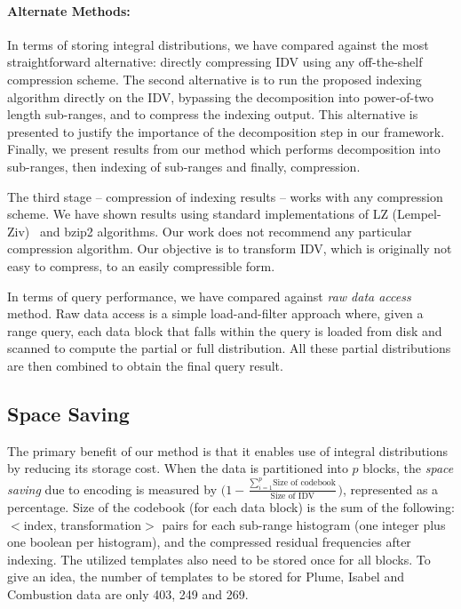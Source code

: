 \paragraph*{Alternate Methods:} In terms of storing integral distributions, we have compared against the most straightforward alternative: directly compressing IDV using any off-the-shelf compression scheme. The second alternative is to run the proposed indexing algorithm directly on the IDV, bypassing the decomposition into power-of-two length sub-ranges, and to compress the indexing output. This alternative is presented to justify the importance of the decomposition step in our framework. Finally, we present results from our method which performs decomposition into sub-ranges, then indexing of sub-ranges and finally, compression. 

The third stage -- compression of indexing results -- works with any compression scheme. We have shown results using standard implementations of LZ (Lempel-Ziv)~\cite{lz77} and bzip2 algorithms. Our work does not recommend any particular compression algorithm. Our objective is to transform IDV, which is originally not easy to compress, to an easily compressible form.

In terms of query performance, we have compared against \emph{raw data access} method. Raw data access is a simple load-and-filter approach where, given a range query, each data block that falls within the query is loaded from disk and scanned to compute the partial or full distribution. All these partial distributions are then combined to obtain the final query result. 
\subsection{Space Saving}
\label{sec:analysis_encoding_space}
The primary benefit of our method is that it enables use of integral distributions by reducing its storage cost. When the data is partitioned into $p$ blocks, the \emph{space saving} due to encoding is measured by $\big ( 1 - \frac{\sum_{i=1}^{p} \text{Size of codebook}}{\text{Size of IDV}} \big )$, represented as a percentage. Size of the codebook (for each data block) is the sum of the following: $<$index, transformation$>$ pairs for each sub-range histogram (one integer plus one boolean per histogram), and the compressed residual frequencies after indexing. The utilized templates also need to be stored once for all blocks. To give an idea, the number of templates to be stored for Plume, Isabel and Combustion data are only 403, 249 and 269.

